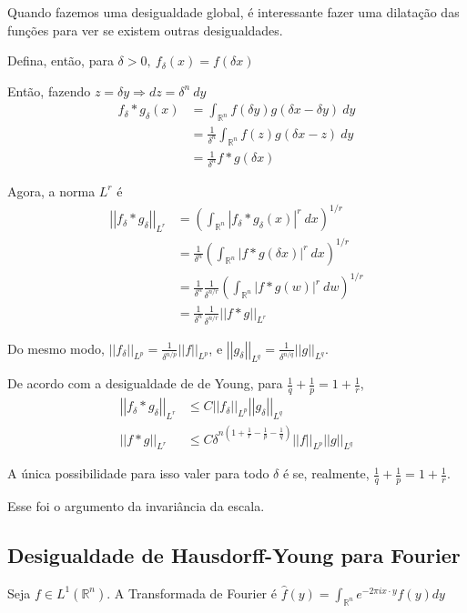 \documentclass[11pt]{article}
\newcommand{\Rn}{{\mathbb{R}^n}}
\newcommand{\dd}{\delta}
\newcommand{\norm}[2]{\left|\left|#1\right|\right|_{L^{#2}}}
\begin{document}
Quando fazemos uma desigualdade global, é interessante fazer uma dilatação das funções para ver se existem outras desigualdades.

Defina, então, para \( \delta>0, \ f_\delta (x) = f(\delta x)\)

Então, fazendo \( z = \dd y \Rightarrow dz = \dd^n\ dy \)\begin{align*}
	f_\dd * g_\dd (x) &= \int_\Rn f(\dd y)g(\dd x - \dd y)\ dy \\
	&= \frac{1}{\dd^n} \int_\Rn f(z)g(\dd x - z)\ dy \\
	&= \frac{1}{\dd^n} f * g(\delta x)
\end{align*}

Agora, a norma \( L^r \) é \begin{align*}
	\norm{f_\dd*g_\dd}{r} &= \left( \int_\Rn | f_\dd * g_\dd (x) |^r \ dx  \right)^{1/r} \\
	&= \frac{1}{\dd^n} \left( \int_\Rn | f * g (\dd x) |^r \ dx \right)^{1/r} \\
	&= \frac{1}{\dd^n}\frac{1}{\dd^{n/r}} \left( \int_\Rn | f * g (w) |^r \ dw \right)^{1/r} \\
	&= \frac{1}{\dd^n}\frac{1}{\dd^{n/r}} \norm{f*g}{r}
\end{align*}

Do mesmo modo, \( \norm{f_\dd}{p} = \frac{1}{\dd^{n/p}}  \norm{f}{p}\), e \( \norm{g_\dd}{q} = \frac{1}{\dd^{n/q}} \norm{g}{q} \).

De acordo com a desigualdade de de Young, para \( \frac{1}{q} + \frac{1}{p} = 1 + \frac{1}{r} \), 
\begin{align*}
	\norm{f_\dd * g_\dd}{r} &\leq C \norm{f_\dd}{p} \norm{g_\dd}{q}\\
	\norm{f * g}{r} &\leq C \dd^{n \left( 1 + \frac{1}{r} - \frac{1}{p} - \frac{1}{q}\right) } \norm{f}{p} \norm{g}{q}
\end{align*}

A única possibilidade para isso valer para todo \( \delta \) é se, realmente, \( \frac{1}{q} + \frac{1}{p} = 1 + \frac{1}{r} \). 

Esse foi o argumento da invariância da escala.

\subsection{Desigualdade de Hausdorff-Young para Fourier}

Seja \( f \in L^1 (\Rn) \). A Transformada de Fourier é \(\hat{f}(y) = \int_\Rn e^{-2\pi i x \cdot y} f(y) dy\)
\end{document}
